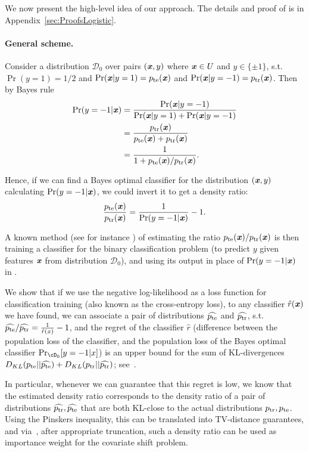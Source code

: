 We now present the high-level idea of our approach. The details and proof of  is in Appendix~\ref{sec:ProofsLogistic}.

\paragraph{General scheme.}
Consider a distribution $\mathcal{D}_0$ over pairs $(\boldsymbol{\mathit{x}},y)$ where $\boldsymbol{\mathit{x}} \in U$ and $y \in \{ \pm 1 \}$, s.t. $\Pr(y = 1) = 1/2$ and $\Pr(\boldsymbol{\mathit{x}} | y=1) = p_{\mathrm{te}}(\boldsymbol{\mathit{x}})$ and $\Pr(\boldsymbol{\mathit{x}} | y=-1) = p_{\mathrm{tr}}(\boldsymbol{\mathit{x}})$. Then by Bayes rule
\begin{align*}
    \Pr(y = -1 | \boldsymbol{\mathit{x}}) &= \frac{\Pr(\boldsymbol{\mathit{x}} | y=-1)}{\Pr(\boldsymbol{\mathit{x}}|y=1) + \Pr(\boldsymbol{\mathit{x}}|y=-1)} \\
    & = \frac{p_{\mathrm{tr}}(\boldsymbol{\mathit{x}})}{p_{\mathrm{te}}(\boldsymbol{\mathit{x}}) + p_{\mathrm{tr}}(\boldsymbol{\mathit{x}})} \\
    &= \frac{1}{1 + p_{\mathrm{te}}(\boldsymbol{\mathit{x}})/p_{\mathrm{tr}}(\boldsymbol{\mathit{x}})}.
\end{align*}

Hence, if we can find a Bayes optimal classifier for the distribution $(\boldsymbol{\mathit{x}},y)$ calculating $\Pr(y=-1 | \boldsymbol{\mathit{x}})$, we could invert it to get a density ratio:
\begin{equation}
\label{eq:classification-dr}
    \frac{p_{\mathrm{te}}(\boldsymbol{\mathit{x}})}{p_{\mathrm{tr}}(\boldsymbol{\mathit{x}})} = \frac{1}{\Pr(y=-1 | \boldsymbol{\mathit{x}})} - 1.
\end{equation}

A known method (see for instance \cite{BS06}) of estimating the ratio $p_{\mathrm{te}}(\boldsymbol{\mathit{x}})/p_{\mathrm{tr}}(\boldsymbol{\mathit{x}})$ is then training a classifier for the binary classification problem (to predict $y$ given features $\boldsymbol{\mathit{x}}$ from distribution $\mathcal{D}_0$), and using its output in place of $\Pr(y=-1 | \boldsymbol{\mathit{x}})$ in .

We show that if we use the negative log-likelihood as a loss function for classification training (also known as the cross-entropy loss), to any classifier $\hat{r}(\boldsymbol{\mathit{x}})$ we have found, we can associate a pair of distributions $\widehat{p_{\mathrm{te}}}$ and $\widehat{p_{\mathrm{tr}}}$, s.t. $\widehat{p_{\mathrm{te}}}/\widehat{p_{\mathrm{tr}}} = \frac{1}{\hat{r}(x)} - 1$, and the regret of the classifier $\hat{r}$ (difference between the population loss of the classifier, and the population loss of the Bayes optimal classifier $\Pr_{\cD_0}[y=-1 | x]$) is an upper bound for the sum of KL-divergences $D_{KL}(p_{\mathrm{te}} || \widehat{p_{\mathrm{te}}}) + D_{KL}(p_{\mathrm{tr}} || \widehat{p_{\mathrm{tr}}})$; see~.

In particular, whenever we can guarantee that this regret is low, we know that the estimated density ratio corresponds to the density ratio of a pair of distributions $\widehat{p_{\mathrm{tr}}}, \widehat{p_{\mathrm{te}}}$ that are both KL-close to the actual distributions $p_{\mathrm{tr}}, p_{\mathrm{te}}$. Using the Pinskers inequality, this can be translated into TV-distance guarantees, and via~, after appropriate truncation, such a density ratio can be used as importance weight for the covariate shift problem.

